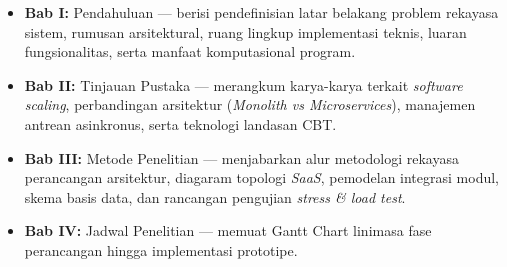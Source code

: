 \begin{itemize}
	\item \textbf{Bab I:} Pendahuluan --- berisi pendefinisian latar belakang problem rekayasa sistem, rumusan arsitektural, ruang lingkup implementasi teknis, luaran fungsionalitas, serta manfaat komputasional program.
	\item \textbf{Bab II:} Tinjauan Pustaka --- merangkum karya-karya terkait \textit{software scaling}, perbandingan arsitektur (\textit{Monolith vs Microservices}), manajemen antrean asinkronus, serta teknologi landasan CBT.
	\item \textbf{Bab III:} Metode Penelitian --- menjabarkan alur metodologi rekayasa perancangan arsitektur, diagaram topologi \textit{SaaS}, pemodelan integrasi modul, skema basis data, dan rancangan pengujian \textit{stress \& load test}.
	\item \textbf{Bab IV:} Jadwal Penelitian --- memuat Gantt Chart linimasa fase perancangan hingga implementasi prototipe.
\end{itemize}
